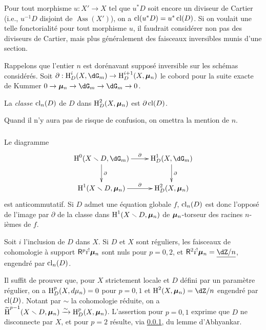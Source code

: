 Pour tout morphisme $u:X'\to X$ tel que $u^* D$ soit encore un diviseur de 
Cartier (i.e., $u^{-1} D$ disjoint de $\operatorname{Ass}(X')$), on a 
$\operatorname{cl}(u^* D) = u^*\operatorname{cl}(D)$. Si on voulait une telle 
fonctorialité pour tout morphisme $u$, il faudrait considérer non pas des 
diviseurs de Cartier, mais plus généralement des faisceaux inversibles 
munis d'une section.

Rappelons que l'entier $n$ est dorénavant supposé inversible sur les 
schémas considérés. Soit 
$\partial:\h_D^i(X,\dG_m) \to \h_D^{i+1}(X,\dmu_n)$ le cobord pour la suite 
exacte de Kummer $0 \to \dmu_n \to \dG_m \to \dG_m \to 0$.





\begin{definition}\label{IV:2-1-2}
La \emph{classe $\operatorname{cl}_n(D)$} de $D$ dans $\operatorname{H}_D^2(X,{\bm\mu}_n)$ est 
$\partial \operatorname{cl}(D)$. 
\end{definition}

Quand il n'y aura pas de risque de confusion, on omettra la mention de $n$. 





\subsubsection{}\label{IV:2-1-3}

Le diagramme 
\[\xymatrix{
  \h^0(X\setminus D,\dG_m) \ar[r]^-\partial \ar[d]^-\partial 
    & \h_D^1(X,\dG_m) \ar[d]^-\partial \\
  \h^1(X\setminus D,\dmu_n) \ar[r]^-\partial 
    & \h_D^2(X,\dmu_n)
}\]
est anticommutatif. Si $D$ admet une équation globale $f$, 
$\operatorname{cl}_n(D)$ est donc l'opposé de l'image par $\partial$ de la 
classe dans $\operatorname{H}^1(X\smallsetminus D,{\bm\mu}_n)$ de ${\bm\mu}_n$-torseur des racines 
$n$-ièmes de $f$. 





\begin{proposition}\label{IV:2-1-4}
Soit $i$ l'inclusion de $D$ dans $X$. Si $D$ et $X$ sont réguliers, les 
faisceaux de cohomologie à support $\mathsf{R}^p i^! {\bm\mu}_n$ sont nuls pour $p=0,2$, 
et $\R^2 i^!\dmu_n = \underline{\dZ/n}$, engendré par 
$\operatorname{cl}_n(D)$. 
\end{proposition}

Il suffit de prouver que, pour $X$ strictement locale et $D$ défini par un 
paramètre régulier, on a $\operatorname{H}_D^p(X,d\mu_n) = 0$ pour $p=0,1$ et 
$\h^2(X,\dmu_n) = \dZ/n$ engendré par $\operatorname{cl}(D)$. Notant par 
$\sim$ la cohomologie réduite, on a 
$\widetilde{\operatorname{H}}^{p-1}(X\smallsetminus D,{\bm\mu}_n)\xrightarrow\sim \operatorname{H}_D^p(X,{\bm\mu}_n)$. L'assertion 
pour $p=0,1$ exprime que $D$ ne disconnecte par $X$, et pour $p=2$ résulte, 
via \ref{IV:2-1-3}, du lemme d'Abhyankar. 

